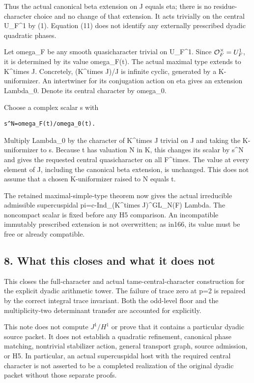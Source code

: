 Thus the actual canonical beta extension on J equals eta; there is no
residue-character choice and no change of that extension. It acts
trivially on the central U\_F\^{}1 by (1). Equation (11) does not
identify any externally prescribed dyadic quadratic phases.

Let omega\_F be any smooth quasicharacter trivial on U\_F\^{}1. Since
\(\mathcal O_F^\times=U_F^1\), it is determined by its value
omega\_F(t). The actual maximal type extends to K\^{}times J.
Concretely, (K\^{}times J)/J is infinite cyclic, generated by a
K-uniformizer. An intertwiner for its conjugation action on eta gives an
extension Lambda\_0. Denote its central character by omega\_0.

Choose a complex scalar s with

\begin{Verbatim}[fontsize=\small,breaklines=true,breakanywhere=true]
s^N=omega_F(t)/omega_0(t).
\end{Verbatim}

Multiply Lambda\_0 by the character of K\^{}times J trivial on J and
taking the K-uniformizer to s. Because t has valuation N in K, this
changes its scalar by s\^{}N and gives the requested central
quasicharacter on all F\^{}times. The value at every element of J,
including the canonical beta extension, is unchanged. This does not
assume that a chosen K-uniformizer raised to N equals t.

The retained maximal-simple-type theorem now gives the actual
irreducible admissible supercuspidal pi=c-Ind\_(K\^{}times
J)\^{}GL\_N(F) Lambda. The noncompact scalar is fixed before any H5
comparison. An incompatible immutably prescribed extension is not
overwritten; as in166, its value must be free or already compatible.

\hypertarget{dyadic_character-what-this-closes-and-what-it-does-not}{%
\subsection{8. What this closes and what it does
not}\label{dyadic_character-what-this-closes-and-what-it-does-not}}

This closes the full-character and actual tame-central-character
construction for the explicit dyadic arithmetic tower. The failure of
trace zero at p=2 is repaired by the correct integral trace invariant.
Both the odd-level floor and the multiplicity-two determinant transfer
are accounted for explicitly.

This note does not compute \(J^1/H^1\) or prove that it
contains a particular dyadic source packet. It does not establish a
quadratic refinement, canonical phase matching, nontrivial stabilizer
action, general transport graph, source admission, or H5. In particular,
an actual supercuspidal host with the required central character is not
asserted to be a completed realization of the original dyadic packet
without those separate proofs.

